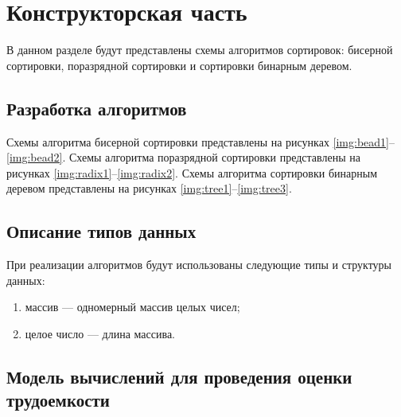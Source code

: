 \chapter{Конструкторская часть}
В данном разделе будут представлены схемы алгоритмов сортировок: бисерной сортировки, поразрядной сортировки и сортировки бинарным деревом.

\section{Разработка алгоритмов}
Схемы алгоритма бисерной сортировки представлены на рисунках \ref{img:bead1}--\ref{img:bead2}. Схемы алгоритма поразрядной сортировки представлены на рисунках \ref{img:radix1}--\ref{img:radix2}. Схемы алгоритма сортировки бинарным деревом представлены на рисунках \ref{img:tree1}--\ref{img:tree3}.
\clearpage
{}
\clearpage

\section{Описание типов данных}
При реализации алгоритмов будут использованы следующие типы и структуры данных:
\begin{enumerate}
    \item массив --- одномерный массив целых чисел;
    \item целое число --- длина массива.
\end{enumerate}


\section{Модель вычислений для проведения оценки трудоемкости}

